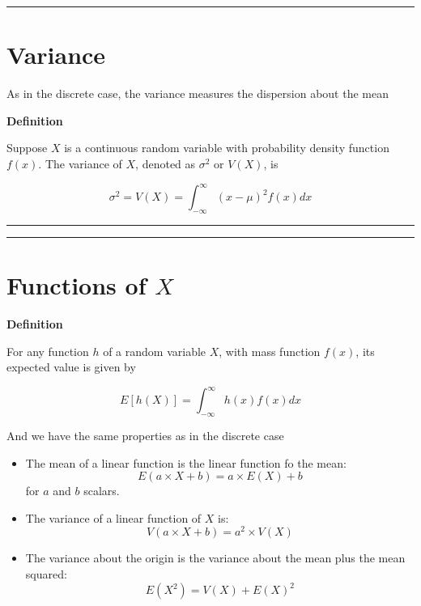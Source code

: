 \documentclass[
]{book}
\begin{document}
\begin{center}\rule{0.5\linewidth}{0.5pt}\end{center}

\hypertarget{variance-1}{%
\section{Variance}\label{variance-1}}

As in the discrete case, the variance measures the dispersion about the mean

\textbf{Definition}

Suppose \(X\) is a continuous random variable with probability density function \(f(x)\). The variance of \(X\), denoted as \(\sigma^2\) or \(V(X)\), is

\[\sigma^2=V(X)=\int_{-\infty}^\infty (x-\mu)^2 f(x) dx\]

\begin{center}\rule{0.5\linewidth}{0.5pt}\end{center}

\begin{center}\rule{0.5\linewidth}{0.5pt}\end{center}

\hypertarget{functions-of-x-1}{%
\section{\texorpdfstring{Functions of \(X\)}{Functions of X}}\label{functions-of-x-1}}

\textbf{Definition}

For any function \(h\) of a random variable \(X\), with mass function \(f(x)\), its expected value is given by

\[E[h(X)]= \int_{-\infty}^{\infty} h(x) f(x)dx\]

And we have the same properties as in the discrete case

\begin{itemize}
\item
  The mean of a linear function is the linear function fo the mean: \[E(a\times X +b)= a\times E(X) +b\] for \(a\) and \(b\) scalars.
\item
  The variance of a linear function of \(X\) is:\[V(a\times X +b)= a^2\times V(X)\]
\item
  The variance about the origin is the variance about the mean plus the mean squared: \[E(X^2)=V(X)+E(X)^2\]
\end{itemize}
\end{document}
